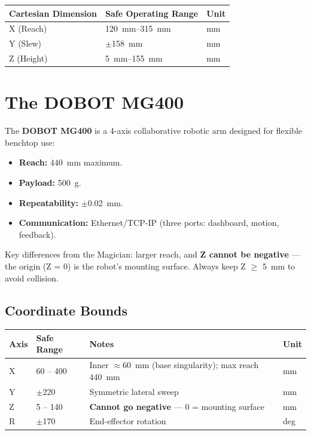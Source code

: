 \documentclass[11pt,a4paper]{article}
\begin{document}
\vspace{10pt}

\begin{tabularx}{\linewidth}{@{}lXl@{}}
  \toprule
  \textbf{Cartesian Dimension} & \textbf{Safe Operating Range} & \textbf{Unit} \\
  \midrule
  X (Reach)  & \qtyrange{120}{315}{\mm} & mm \\
  Y (Slew)   & $\pm$\qty{158}{\mm}      & mm \\
  Z (Height) & \qtyrange{5}{155}{\mm}   & mm \\
  \bottomrule
\end{tabularx}

\section{The DOBOT MG400}

The \textbf{DOBOT MG400} is a 4-axis collaborative robotic arm designed for flexible benchtop use:
\begin{itemize}
  \item \textbf{Reach:} \qty{440}{\mm} maximum.
  \item \textbf{Payload:} \qty{500}{\g}.
  \item \textbf{Repeatability:} $\pm$\qty{0.02}{\mm}.
  \item \textbf{Communication:} Ethernet/TCP-IP (three ports: dashboard, motion, feedback).
\end{itemize}

Key differences from the Magician: larger reach, and \textbf{Z cannot be negative} — the origin
(Z = 0) is the robot's mounting surface. Always keep Z $\geq$ \qty{5}{\mm} to avoid collision.

\subsection{Coordinate Bounds}

\begin{tabularx}{\linewidth}{@{}llXl@{}}
  \toprule
  \textbf{Axis} & \textbf{Safe Range} & \textbf{Notes} & \textbf{Unit} \\
  \midrule
  X & 60 -- 400   & Inner $\approx$\qty{60}{\mm} (base singularity); max reach \qty{440}{\mm} & mm \\
  Y & $\pm$220    & Symmetric lateral sweep & mm \\
  Z & 5 -- 140    & \textbf{Cannot go negative} — 0 = mounting surface & mm \\
  R & $\pm$170    & End-effector rotation & deg \\
  \bottomrule
\end{tabularx}
\end{document}
